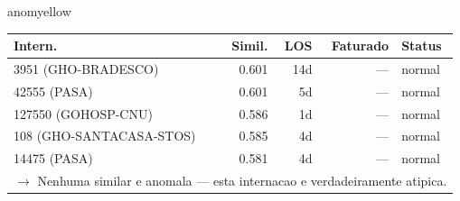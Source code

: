 \documentclass[a4paper,10pt]{article}
\begin{document}
\begin{anomalycard}[Internacao 167396 | GHO-PETROBRAS | MODERADO (z=2.17)]{anomyellow}
\begin{tabular}{l r r r l}\toprule\textbf{Intern.} & \textbf{Simil.} & \textbf{LOS} & \textbf{Faturado} & \textbf{Status} \\\midrule
3951 (GHO-BRADESCO) & 0.601 & 14d & --- & \textcolor{jcubeblue}{normal} \\
42555 (PASA) & 0.601 & 5d & --- & \textcolor{jcubeblue}{normal} \\
127550 (GOHOSP-CNU) & 0.586 & 1d & --- & \textcolor{jcubeblue}{normal} \\
108 (GHO-SANTACASA-STOS) & 0.585 & 4d & --- & \textcolor{jcubeblue}{normal} \\
14475 (PASA) & 0.581 & 4d & --- & \textcolor{jcubeblue}{normal} \\
\multicolumn{5}{l}{\textcolor{jcubeblue}{\small $\rightarrow$ Nenhuma similar e anomala --- esta internacao e verdadeiramente atipica.}} \\
\bottomrule\end{tabular}


\end{anomalycard}

\newpage
\end{document}
